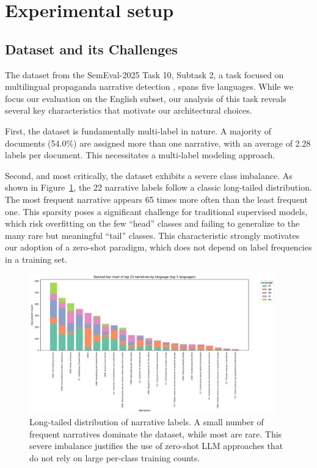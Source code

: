 \section{Experimental setup}

\subsection{Dataset and its Challenges}

The dataset from the SemEval-2025 Task 10, Subtask 2, a task focused on multilingual propaganda narrative detection \cite{semeval2025task10}, spans five languages. While we focus our evaluation on the English subset, our analysis of this task reveals several key characteristics that motivate our architectural choices.

First, the dataset is fundamentally multi-label in nature. A majority of documents (54.0\%) are assigned more than one narrative, with an average of 2.28 labels per document. This necessitates a multi-label modeling approach.

Second, and most critically, the dataset exhibits a severe class imbalance. As shown in Figure~\ref{fig:narrative_distribution}, the 22 narrative labels follow a classic long-tailed distribution. The most frequent narrative appears 65 times more often than the least frequent one. This sparsity poses a significant challenge for traditional supervised models, which risk overfitting on the few ``head'' classes and failing to generalize to the many rare but meaningful ``tail'' classes. This characteristic strongly motivates our adoption of a zero-shot paradigm, which does not depend on label frequencies in a training set.

\begin{figure}[!ht]
\centering
\includegraphics[width=0.95\textwidth]{assets/images/data_description/narrative_distribution.png}
\caption{Long-tailed distribution of narrative labels. A small number of frequent narratives dominate the dataset, while most are rare. This severe imbalance justifies the use of zero-shot LLM approaches that do not rely on large per-class training counts.}
\label{fig:narrative_distribution}
\end{figure}

